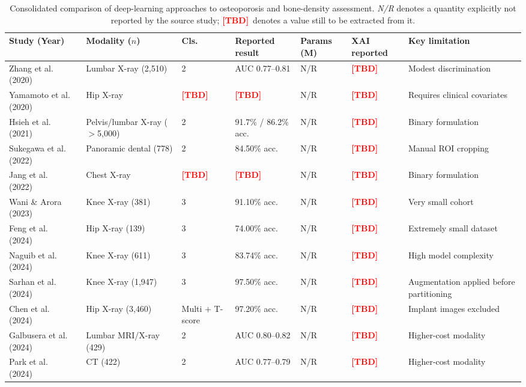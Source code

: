 \documentclass[journal]{IEEEtran}
\newcommand{\PEND}{\textcolor{red}{\textbf{[TBD]}}}
\begin{document}
\begin{table}[!t]
\centering
\caption{Consolidated comparison of deep-learning approaches to osteoporosis and
bone-density assessment. \emph{N/R} denotes a quantity explicitly not reported
by the source study; \PEND\ denotes a value still to be extracted from it.}
\label{tab:litreview}
\scriptsize
\setlength{\tabcolsep}{3pt}
\begin{tabular}{@{}p{2.35cm} p{2.8cm} p{1.05cm} p{2.05cm} p{1.0cm} p{1.65cm} p{4.3cm}@{}}
\toprule
\textbf{Study (Year)} & \textbf{Modality ($n$)} & \textbf{Cls.} &
\textbf{Reported result} & \textbf{Params (M)} & \textbf{XAI reported} &
\textbf{Key limitation} \\
\midrule
Zhang et al.~\cite{zhang2020deep} (2020) & Lumbar X-ray (2{,}510) & 2 & AUC 0.77--0.81 & N/R & \PEND & Modest discrimination \\
Yamamoto et al.~\cite{yamamoto2020deep} (2020) & Hip X-ray & \PEND & \PEND & N/R & \PEND & Requires clinical covariates \\
Hsieh et al.~\cite{hsieh2021automated} (2021) & Pelvis/lumbar X-ray ($>$5{,}000) & 2 & 91.7\% / 86.2\% acc. & N/R & \PEND & Binary formulation \\
Sukegawa et al.~\cite{sukegawa2022identification} (2022) & Panoramic dental (778) & 2 & 84.50\% acc. & N/R & \PEND & Manual ROI cropping \\
Jang et al.~\cite{jang2022opportunistic} (2022) & Chest X-ray & \PEND & \PEND & N/R & \PEND & Binary formulation \\
Wani \& Arora~\cite{wani2023osteoporosis} (2023) & Knee X-ray (381) & 3 & 91.10\% acc. & N/R & \PEND & Very small cohort \\
Feng et al.~\cite{Feng2024} (2024) & Hip X-ray (139) & 3 & 74.00\% acc. & N/R & \PEND & Extremely small dataset \\
Naguib et al.~\cite{Naguib2024} (2024) & Knee X-ray (611) & 3 & 83.74\% acc. & N/R & \PEND & High model complexity \\
Sarhan et al.~\cite{Sarhan2024} (2024) & Knee X-ray (1{,}947) & 3 & 97.50\% acc. & N/R & \PEND & Augmentation applied before partitioning \\
Chen et al.~\cite{Chen2024} (2024) & Hip X-ray (3{,}460) & Multi + T-score & 97.20\% acc. & N/R & \PEND & Implant images excluded \\
Galbusera et al.~\cite{galbusera2024estimating} (2024) & Lumbar MRI/X-ray (429) & 2 & AUC 0.80--0.82 & N/R & \PEND & Higher-cost modality \\
Park et al.~\cite{park2024automated} (2024) & CT (422) & 2 & AUC 0.77--0.79 & N/R & \PEND & Higher-cost modality \\

\end{tabular}
\end{table}
\end{document}
